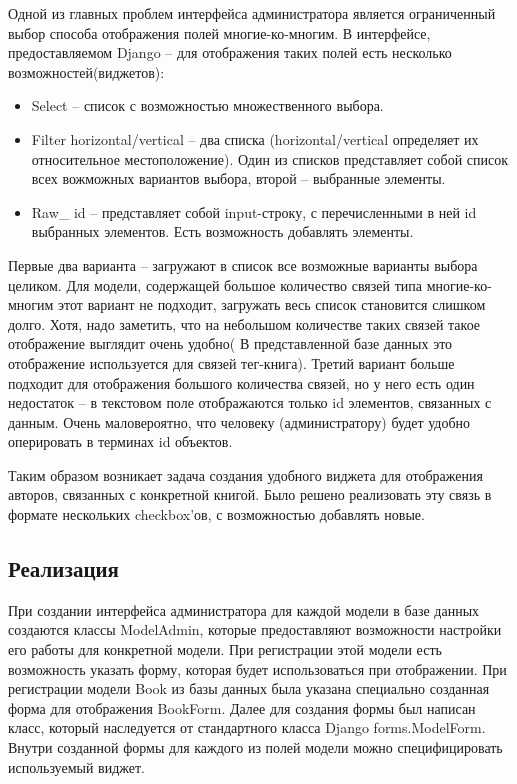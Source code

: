 \documentclass[a4paper]{report}
\begin{document}
Одной из главных проблем интерфейса администратора является ограниченный выбор способа отображения полей многие-ко-многим. В интерфейсе, предоставляемом Django -- для отображения таких полей есть несколько возможностей(виджетов):
\begin{itemize}
	\item Select -- список с возможностью множественного выбора.
	\item Filter horizontal/vertical -- два списка (horizontal/vertical определяет их относительное местоположение). Один из списков представляет собой список всех вожможных вариантов выбора, второй -- выбранные элементы.
	\item Raw\_ id -- представляет собой input-строку, с перечисленными в ней id выбранных элементов. Есть возможность добавлять элементы.
\end{itemize}
Первые два варианта -- загружают в список все возможные варианты выбора целиком. Для модели, содержащей большое количество связей типа многие-ко-многим этот вариант не подходит, \tk загружать весь список становится слишком долго. Хотя, надо заметить, что на небольшом количестве таких связей такое отображение выглядит очень удобно( В представленной базе данных это отображение используется для связей тег-книга). 
Третий вариант больше подходит для отображения большого количества связей, но у него есть один недостаток -- в текстовом поле отображаются только id элементов, связанных с данным. Очень маловероятно, что человеку (администратору) будет удобно оперировать в терминах id объектов.

Таким образом возникает задача создания удобного виджета для отображения авторов, связанных с конкретной книгой.
Было решено реализовать эту связь в формате нескольких checkbox'ов, с возможностью добавлять
новые.

\subsection{Реализация}

При создании интерфейса администратора для каждой модели в базе данных создаются классы ModelAdmin, которые предоставляют возможности настройки его работы для конкретной модели. При регистрации этой модели есть возможность указать форму, которая будет использоваться при отображении. При регистрации модели Book из базы данных была указана специально созданная форма для отображения BookForm. Далее для создания формы был написан класс, который наследуется от стандартного класса Django forms.ModelForm. Внутри созданной формы для каждого из полей модели можно специфицировать используемый виджет.
\end{document}
